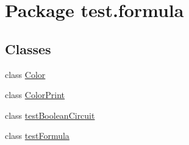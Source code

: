 \hypertarget{namespacetest_1_1formula}{}\section{Package test.\+formula}
\label{namespacetest_1_1formula}
\subsection*{Classes}
\begin{DoxyCompactItemize}
\item 
class \hyperlink{classtest_1_1formula_1_1_color}{Color}
\item 
class \hyperlink{classtest_1_1formula_1_1_color_print}{Color\+Print}
\item 
class \hyperlink{classtest_1_1formula_1_1test_boolean_circuit}{test\+Boolean\+Circuit}
\item 
class \hyperlink{classtest_1_1formula_1_1test_formula}{test\+Formula}
\end{DoxyCompactItemize}
